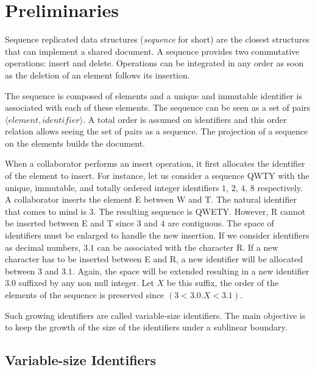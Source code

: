 
\section{Preliminaries}
\label{sec:preliminaries}

Sequence replicated data structures (\emph{sequence} for short) are the closest
structures that can implement a shared document. A sequence provides two
commutative operations: insert and delete. Operations can be integrated in any
order as soon as the deletion of an element follows its insertion.

The sequence is composed of elements and a unique and immutable identifier is
associated with each of these elements. The sequence can be seen as a set of
pairs $\langle element, identifier \rangle$. A total order is assumed on
identifiers and this order relation allows seeing the set of pairs as a
sequence. The projection of a sequence on the elements builds the document.

When a collaborator performs an insert operation, it first allocates the
identifier of the element to insert. For instance, let us consider a sequence
QWTY with the unique, immutable, and totally ordered integer identifiers $1$,
$2$, $4$, $8$ respectively. A collaborator inserts the element E between W and
T. The natural identifier that comes to mind is $3$. The resulting sequence is
QWETY. However, R cannot be inserted between E and T since $3$ and $4$ are
contiguous. The space of identifiers must be enlarged to handle the new
insertion. If we consider identifiers as decimal numbers, $3.1$ can be
associated with the character R. If a new character has to be inserted between E
and R, a new identifier will be allocated between $3$ and $3.1$. Again, the
space will be extended resulting in a new identifier $3.0$ suffixed by any non
null integer. Let $X$ be this suffix, the order of the elements of the sequence
is preserved since $(3 < 3.0.X < 3.1)$.

Such growing identifiers are called variable-size identifiers. The main
objective is to keep the growth of the size of the identifiers under a sublinear
boundary.

\subsection{Variable-size Identifiers}
\label{subsec:variable}

